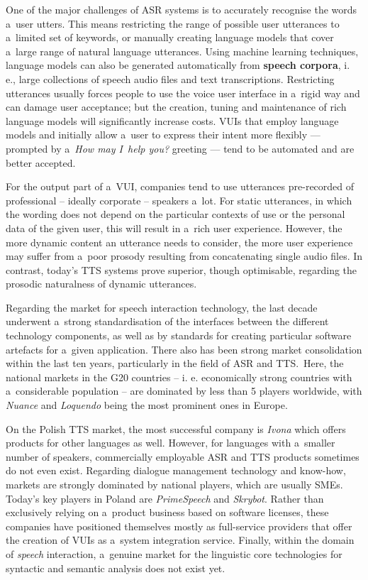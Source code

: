 \begin{multicols}{2}
One of the major challenges of ASR systems is to accurately recognise
the words a~user utters. This means restricting the range of possible
user utterances to a~limited set of keywords, or manually creating
language models that cover a~large range of natural language
utterances. Using machine learning techniques, language models can
also be generated automatically from \textbf{speech corpora}, i.\, e.,
large collections of speech audio files and text transcriptions.
Restricting utterances usually forces people to use the voice user
interface in a~rigid way and can damage user acceptance; but the
creation, tuning and maintenance of rich language models will
significantly increase costs. VUIs that employ language models and
initially allow a~user to express their intent more flexibly —
prompted by a~\textit{How may I~help you?} greeting — tend to be
automated and are better accepted. 

For the output part of a~VUI, companies tend to use utterances pre-recorded of professional – ideally corporate – speakers a~lot.
For static utterances, in which the wording does not depend on the
particular contexts of use or the personal data of the given user,
this will result in a~rich user experience. However, the more dynamic
content an utterance needs to consider, the more user experience may
suffer from a~poor prosody resulting from concatenating single audio
files. In contrast, today’s TTS systems prove superior, though
optimisable, regarding the prosodic naturalness of dynamic utterances. 


Regarding the market for speech interaction technology, the last
decade underwent a~strong standardisation of the interfaces between
the different technology components, as well as by standards for
creating particular software artefacts for a~given application. There
also has been strong market consolidation within the last ten years,
particularly in the field of ASR and TTS.~Here, the national markets
in the G20 countries -- i. e. economically strong countries with
a~considerable population -- are dominated by less than 5 players
worldwide, with \textit{Nuance} and \textit{Loquendo} being the most
prominent ones in Europe. 

On the Polish TTS market, the most successful company is \textit{Ivona
}which offers products for other languages as well. However, for
languages with a~smaller number of speakers, commercially employable
ASR and TTS products sometimes do not even exist. Regarding dialogue
management technology and know-how, markets are strongly dominated by
national players, which are usually SMEs. Today’s key players in
Poland are \textit{PrimeSpeech} and \textit{Skrybot}. Rather than
exclusively relying on a~product business based on software licenses,
these companies have positioned themselves mostly as full-service
providers that offer the creation of VUIs as a~system integration
service. Finally, within the domain of \textit{speech} interaction,
a~genuine market for the linguistic core technologies for syntactic
and semantic analysis does not exist yet. 


\end{multicols}
